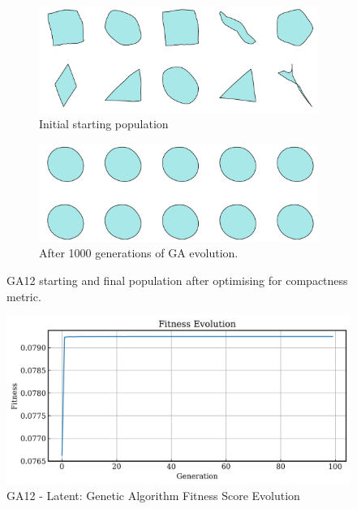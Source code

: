 \documentclass{article}
\begin{document}
\begin{figure}[H]
    \centering
    \begin{subfigure}[b]{0.45\textwidth}
        \centering
        \includegraphics[width=\textwidth]{figures/GAResults/GA12/initial_pop10.png}
        \caption{Initial starting population}
        \label{fig:GA12_starting}
    \end{subfigure}
    \hfill
    \begin{subfigure}[b]{0.45\textwidth}
        \centering
        \includegraphics[width=\textwidth]{figures/GAResults/GA12/final_pop10.png}
        \caption{After 1000 generations of GA evolution.}
        \label{fig:GA12_final}
    \end{subfigure}
    \caption{GA12 starting and final population after optimising for compactness metric.}
    \label{fig:GA12_before_after_GA}
\end{figure}

\begin{figure}[H]
    \centering
    \includegraphics[width=0.75\linewidth]{figures/GAResults/GA12/100gen_fitness.png}
    \caption{GA12 - Latent: Genetic Algorithm Fitness Score Evolution}
    \label{fig:GA12_fitness}
\end{figure}
\end{document}
